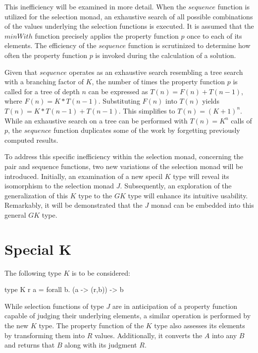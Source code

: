 \documentclass[runningheads]{llncs}
\begin{document}
This inefficiency will be examined in more detail. When the \(sequence\)
function is utilized for the selection monad, an exhaustive search of
all possible combinations of the values underlying the selection
functions is executed. It is assumed that the \(minWith\) function
precisely applies the property function \(p\) once to each of its
elements. The efficiency of the \(sequence\) function is scrutinized to
determine how often the property function \(p\) is invoked during the
calculation of a solution.

Given that \(sequence\) operates as an exhaustive search resembling a
tree search with a branching factor of \(K\), the number of times the
property function \(p\) is called for a tree of depth \(n\) can be
expressed as \(T(n) = F(n) + T(n-1)\), where \(F(n) = K * T(n-1)\).
Substituting \(F(n)\) into \(T(n)\) yields
\(T(n) = K * T(n-1) + T(n-1)\). This simplifies to \(T(n) = (K + 1)^n\).
While an exhaustive search on a tree can be performed with
\(T(n) = K^n\) calls of \(p\), the \(sequence\) function duplicates some
of the work by forgetting previously computed results.

To address this specific inefficiency within the selection monad,
concerning the pair and sequence functions, two new variations of the
selection monad will be introduced. Initially, an examination of a new
specil \(K\) type will reveal its isomorphism to the selection monad
\(J\). Subsequently, an exploration of the generalization of this \(K\)
type to the \(GK\) type will enhance its intuitive usability.
Remarkably, it will be demonstrated that the \(J\) monad can be embedded
into this general \(GK\) type.

\section{Special K}\label{special-k}

The following type \(K\) is to be considered:

\begin{code}
type K r a = forall b. (a -> (r,b)) -> b
\end{code}

While selection functions of type \(J\) are in anticipation of a
property function capable of judging their underlying elements, a
similar operation is performed by the new \(K\) type. The property
function of the \(K\) type also assesses its elements by transforming
them into \(R\) values. Additionally, it converts the \(A\) into any
\(B\) and returns that \(B\) along with its judgment \(R\).
\end{document}
